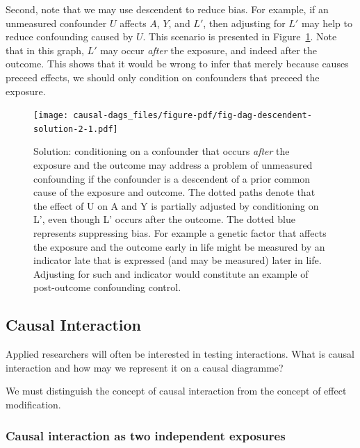 \documentclass[
  singlecolumn]{report}
\begin{document}
Second, note that we may use descendent to reduce bias. For example, if
an unmeasured confounder \(U\) affects \(A\), \(Y\), and \(L\prime\),
then adjusting for \(L\prime\) may help to reduce confounding caused by
\(U\). This scenario is presented in
Figure~\ref{fig-dag-descendent-solution-2}. Note that in this graph,
\(L\prime\) may occur \emph{after} the exposure, and indeed after the
outcome. This shows that it would be wrong to infer that merely because
causes preceed effects, we should only condition on confounders that
preceed the exposure.

\begin{figure}

{\centering \texttt{[image: causal-dags\_files/figure-pdf/fig-dag-descendent-solution-2-1.pdf]}

}

\caption{\label{fig-dag-descendent-solution-2}Solution: conditioning on
a confounder that occurs \emph{after} the exposure and the outcome may
address a problem of unmeasured confounding if the confounder is a
descendent of a prior common cause of the exposure and outcome. The
dotted paths denote that the effect of U on A and Y is partially
adjusted by conditioning on L', even though L' occurs after the outcome.
The dotted blue represents suppressing bias. For example a genetic
factor that affects the exposure and the outcome early in life might be
measured by an indicator late that is expressed (and may be measured)
later in life. Adjusting for such and indicator would constitute an
example of post-outcome confounding control.}

\end{figure}

\hypertarget{causal-interaction}{%
\subsection{Causal Interaction}\label{causal-interaction}}

Applied researchers will often be interested in testing interactions.
What is causal interaction and how may we represent it on a causal
diagramme?

We must distinguish the concept of causal interaction from the concept
of effect modification.

\hypertarget{causal-interaction-as-two-independent-exposures}{%
\subsubsection{\texorpdfstring{\textbf{Causal interaction as two
independent
exposures}}{Causal interaction as two independent exposures}}\label{causal-interaction-as-two-independent-exposures}}
\end{document}
